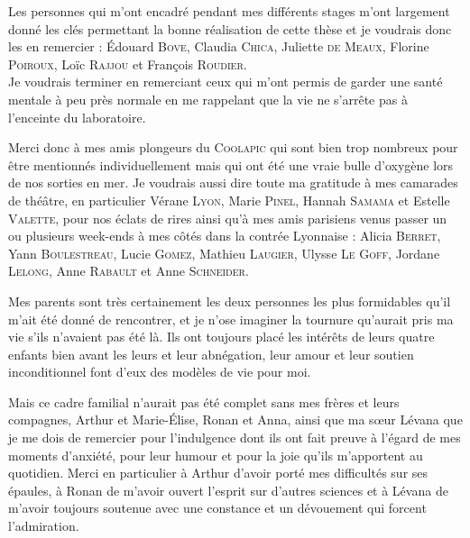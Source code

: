 Les personnes qui m'ont encadré pendant mes différents stages m'ont largement donné les clés permettant la bonne réalisation de cette thèse et je voudrais donc les en remercier : 
\'Edouard \textsc{Bove},
Claudia \textsc{Chica},
Juliette \textsc{de Meaux},
Florine \textsc{Poiroux},
Loïc \textsc{Rajjou} et
François \textsc{Roudier}.\\








Je voudrais terminer en remerciant ceux qui m'ont permis de garder une santé mentale à peu près normale en me rappelant que la vie ne s'arrête pas à l'enceinte du laboratoire.

Merci donc à mes amis plongeurs du \textsc{Coolapic} qui sont bien trop nombreux pour être mentionnés individuellement mais qui ont été une vraie bulle d'oxygène lors de nos sorties en mer.
Je voudrais aussi dire toute ma gratitude à mes camarades de thé\^atre, en particulier Vérane \textsc{Lyon}, Marie \textsc{Pinel}, Hannah \textsc{Samama} et Estelle \textsc{Valette}, pour nos éclats de rires ainsi qu'à mes amis parisiens venus passer un ou plusieurs week-ends à mes côtés dans la contrée Lyonnaise : Alicia \textsc{Berret}, Yann \textsc{Boulestreau}, Lucie \textsc{Gomez}, Mathieu \textsc{Laugier}, Ulysse \textsc{Le Goff}, Jordane \textsc{Lelong}, Anne \textsc{Rabault} et Anne \textsc{Schneider}.


Mes parents sont très certainement les deux personnes les plus formidables qu'il m'ait été donné de rencontrer, et je n'ose imaginer la tournure qu'aurait pris ma vie s'ils n'avaient pas été là.
Ils ont toujours placé les intérêts de leurs quatre enfants bien avant les leurs et leur abnégation, leur amour et leur soutien inconditionnel font d'eux des modèles de vie pour moi.


Mais ce cadre familial n'aurait pas été complet sans mes frères et leurs compagnes, Arthur et Marie-\'Elise, Ronan et Anna, ainsi que ma sœur Lévana que je me dois de remercier pour l'indulgence dont ils ont fait preuve à l'égard de mes moments d'anxiété, pour leur humour et pour la joie qu'ils m'apportent au quotidien.
Merci en particulier à Arthur d'avoir porté mes difficultés sur ses épaules, à Ronan de m'avoir ouvert l'esprit sur d'autres sciences et à Lévana de m'avoir toujours soutenue avec une constance et un dévouement qui forcent l'admiration.

